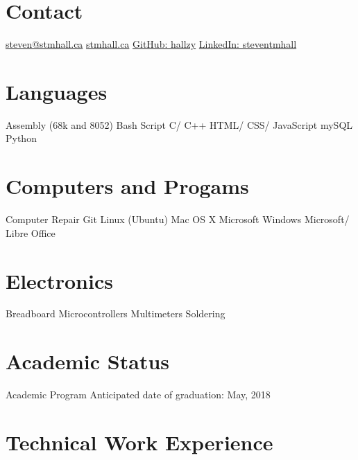 \documentclass[]{friggeri-cv} %
\begin{document}


\begin{aside} %
\section{Contact}
\href{mailto:steven@stmhall.ca}{steven@stmhall.ca}
\href{http://stmhall.ca}{stmhall.ca}
\href{http://github.com/hallzy}{GitHub: hallzy}
\href{https://www.linkedin.com/in/steventmhall}{LinkedIn: steventmhall}
\section{Languages}
Assembly (68k and 8052)
Bash Script
C/ C++
HTML/ CSS/ JavaScript
mySQL
Python
\section{Computers and Progams}
Computer Repair
Git
Linux (Ubuntu)
Mac OS X
Microsoft Windows
Microsoft/ Libre Office
\section{Electronics}
Breadboard
Microcontrollers
Multimeters
Soldering
\end{aside}

\section{Academic Status}

\begin{entrylist}

\entry
{}
{Academic Program}
{}
{
Anticipated date of graduation: May, 2018
}
\end{entrylist}

\section{Technical Work Experience}
\end{document}
